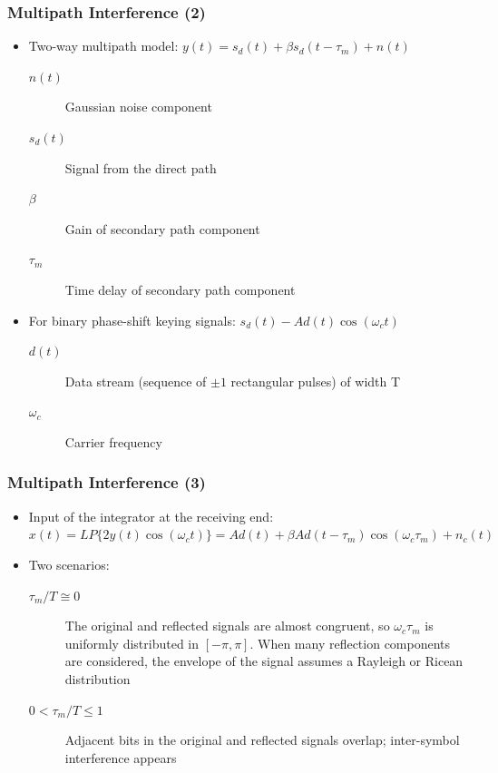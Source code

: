 \documentclass{beamer}
\begin{document}
\begin{frame}
	\frametitle{Multipath Interference (2)}
	\begin{itemize}
		\item Two-way multipath model: $ y(t) = s_d(t) + \beta s_d(t - \tau_m) + n(t) $
		\begin{description}
			\item[$ n(t) $] Gaussian noise component
			\item[$ s_d(t) $] Signal from the direct path
			\item[$ \beta $] Gain of secondary path component
			\item[$ \tau_m $] Time delay of secondary path component
		\end{description}
		\item For binary phase-shift keying signals: $ s_d(t) - Ad(t)\cos(\omega_c t) $
		\begin{description}
			\item[$ d(t) $] Data stream (sequence of $ \pm1 $ rectangular pulses) of width T
			\item[$ \omega_c $] Carrier frequency
		\end{description}
	\end{itemize}
\end{frame}

\begin{frame}
	\frametitle{Multipath Interference (3)}
	\begin{itemize}
		\item Input of the integrator at the receiving end: $ x(t) = LP\{2y(t)\cos(\omega_c t)\} = Ad(t) + \beta Ad(t - \tau_m)\cos(\omega_c \tau_m) + n_c(t) $
		\item Two scenarios:
		\begin{description}
			\item[$ \tau_m/T \cong 0 $] The original and reflected signals are almost congruent, so $ \omega_c \tau_m $ is uniformly distributed in $ [-\pi, \pi] $. When many reflection components are considered, the envelope of the signal assumes a Rayleigh or Ricean distribution
			\item[$ 0 < \tau_m/T \leq 1 $] Adjacent bits in the original and reflected signals overlap; inter-symbol interference appears
		\end{description}
	\end{itemize}
\end{frame}
\end{document}

